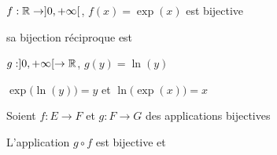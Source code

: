\begin{frame}


\pause

\vspace*{-5mm}
\begin{exemple}
\vspace*{-0mm}
\begin{minipage}{0.65\textwidth}
\vspace*{-20mm}
\center
$f : \mathbb{R} \to ]0,+\infty[$, $f(x)=\exp(x)$ est bijective

\pause

sa bijection réciproque est 

$g : ]0,+\infty[ \to \mathbb{R}$, $g(y)=\ln(y)$

\pause
\bigskip

$\exp\big(\ln(y) \big) = y$ \quad et \quad   $\ln\big(\exp(x)\big) = x$
  
\end{minipage}
\pause
\begin{minipage}{0.29\textwidth}
\end{minipage}


\end{exemple}




\end{frame}



\begin{frame}

\begin{proposition}
\label{prop:bij2}
Soient $f : E \to F$ et $g : F \to G$ des applications bijectives

L'application $g \circ f$ est bijective 
\pause
et
\end{proposition}

\end{frame}

